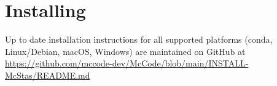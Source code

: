\chapter{Installing \MCS}
\label{installing}
Up to date installation instructions for all supported platforms
(conda, Linux/Debian, macOS, Windows) are maintained on GitHub at
\url{https://github.com/mccode-dev/McCode/blob/main/INSTALL-McStas/README.md}
